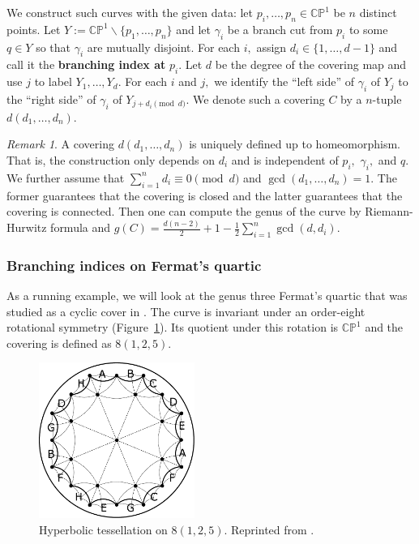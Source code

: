\documentclass[12pt,reqno]{amsart}
\theoremstyle{definition}
\theoremstyle{remark}
\newtheorem*{remark}{Remark}
\begin{document}
We construct such curves with the given data: let $p_i, \ldots , p_n \in \mathbb{C}\mathbb{P}^1$ be $n$ distinct points. Let $Y := \mathbb{C}\mathbb{P}^1 \backslash \{p_1, \ldots, p_n\}$ and let $\gamma_i$ be a branch cut from $p_i$ to some $q \in Y$ so that $\gamma_i$ are mutually disjoint. For each $i,$ assign $d_i \in \{1, \ldots, d - 1\}$ and call it the \textbf{branching index at} $p_i.$ Let $d$ be the degree of the covering map and use $j$ to label $Y_1, \ldots , Y_d.$ For each $i$ and $j,$ we identify the ``left side'' of $\gamma_i$ of $Y_j$ to the ``right side'' of $\gamma_i$ of $Y_{j + d_i \pmod d}.$ We denote such a covering $C$ by a $n$-tuple $d (d_1, \ldots , d_n).$


\begin{remark} A covering $d (d_1, \ldots , d_n)$ is uniquely defined up to homeomorphism. That is, the construction only depends on $d_i$ and is independent of $p_i,$ $\gamma_i,$ and $q.$ We further assume that $\sum\limits_{i=1}^n d_i \equiv 0 \pmod d$ and $\gcd (d_1, \ldots, d_n) = 1.$ The former guarantees that the covering is closed and the latter guarantees that the covering is connected. Then one can compute the genus of the curve by Riemann-Hurwitz formula and $g(C) = \frac{d (n-2)}{2} + 1 - \frac{1}{2} \sum\limits_{i=1}^n \gcd(d,d_i).$ 
\end{remark}

\subsubsection*{Branching indices on Fermat's quartic}
As a running example, we will look at the genus three Fermat's quartic that was studied as a cyclic cover in \cite{dami}. The curve is invariant under an order-eight rotational symmetry (Figure~\ref{fig:125}). Its quotient under this rotation is $\mathbb{C}\mathbb{P}^1$ and the covering is defined as $8 (1, 2, 5).$

\begin{figure}[htbp] 
   \centering
   \includegraphics[width=2in]{figures/125_base.pdf} 
  \caption{Hyperbolic tessellation on $8(1, 2, 5).$ Reprinted from \cite{dami}.}
  \label{fig:125}
\end{figure}
\end{document}
